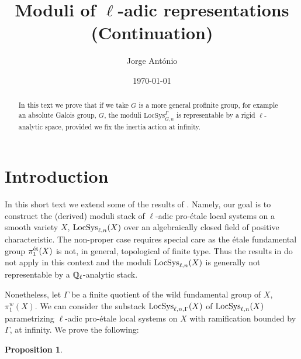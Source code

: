 \documentclass[10pt,a4paper]{amsart}
\author{Jorge Ant\'onio}
\numberwithin{equation}{subsection}
\theoremstyle{plain}
\newtheorem{prop}[theorem]{Proposition}
\theoremstyle{definition}
\theoremstyle{remark}
\numberwithin{equation}{section}
\begin{document}
\title{Moduli of $\ell$-adic representations (Continuation)}




\date{\today}

\maketitle

\renewcommand\labelitemi{\textbullet}








\begin{abstract}
In this text we prove that if we take $G$ is a more general profinite group, for example an absolute Galois group, $G$, the moduli $\mathrm{LocSys}_{G,n}^{ \Gamma}$ is representable by a rigid $\ell$-analytic space, provided we fix the inertia action at infinity.
\end{abstract}

\setcounter{tocdepth}{1}
\tableofcontents


\section*{Introduction}
In this short text we extend some of the results of \cite{me1}. Namely, our goal is to construct the (derived) moduli stack of $\ell$-adic pro-\'etale local systems on a smooth variety $X$, $\mathrm{LocSys}_{\ell, n}(X)$ over an algebraically closed field of positive characteristic.
The non-proper case requires special care as the \'etale fundamental group $\pi_1^{\text{\'et}}(X)$ is not, in general, topological of finite type. Thus the results in \cite{me1} do not apply in this context and the moduli $\mathrm{LocSys}_{\ell, n}(X)$ is generally not representable
by a $\mathbb{Q}_\ell$-analytic stack.

Nonetheless, let $\Gamma$ be a finite quotient of the wild fundamental group of $X$, $\pi_1^w(X)$. We can consider the substack $\mathrm{LocSys}_{\ell, n, \Gamma}(X)  $ of $\mathrm{LocSys}_{\ell, n}(X)$ parametrizing $\ell$-adic pro-\'etale local systems on $X$ with ramification
bounded by $\Gamma$, at infinity. We prove the following:

\begin{prop}

\end{prop}
\end{document}
